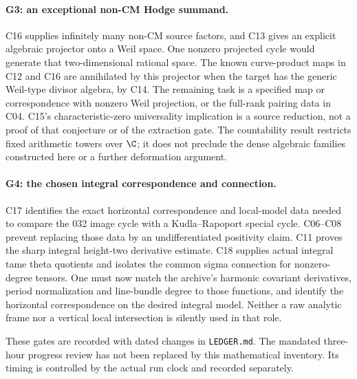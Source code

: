 \paragraph{G3: an exceptional non-CM Hodge summand.}
C16 supplies infinitely many non-CM source factors, and C13 gives
an explicit algebraic projector onto a Weil space. One nonzero
projected cycle would generate that two-dimensional rational space.
The known curve-product maps in C12 and C16 are annihilated by this
projector when the target has the generic Weil-type divisor algebra,
by C14. The remaining task is a specified map or correspondence
with nonzero Weil projection, or the full-rank pairing data in C04.
C15's characteristic-zero universality implication is a source
reduction, not a proof of that conjecture or of the extraction gate.
The countability result restricts fixed arithmetic towers over
$\C$; it does not preclude the dense algebraic families constructed
here or a further deformation argument.

\paragraph{G4: the chosen integral correspondence and connection.}
C17 identifies the exact horizontal correspondence and local-model
data needed to compare the 032 image cycle with a Kudla--Rapoport
special cycle. C06--C08 prevent replacing those data by an
undifferentiated positivity claim. C11 proves the sharp integral
height-two derivative estimate. C18 supplies actual integral tame
theta quotients and isolates the common sigma connection for
nonzero-degree tensors. One must now match the archive's harmonic
covariant derivatives, period normalization and line-bundle degree
to those functions, and identify the horizontal correspondence on
the desired integral model. Neither a raw analytic frame nor a
vertical local intersection is silently used in that role.

These gates are recorded with dated changes in \texttt{LEDGER.md}.
The mandated three-hour progress review has not been replaced by
this mathematical inventory. Its timing is controlled by the actual
run clock and recorded separately.
